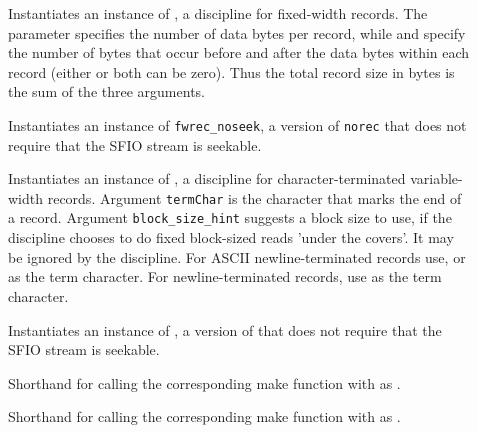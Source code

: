 \begin{description}
\item
[\small{}]
 Instantiates an instance of , a discipline for fixed-width
 records.  The parameter  specifies the number of data bytes per record,
 while  and  specify the number of bytes that
 occur before and after the data bytes within each record (either or
 both can be zero).  Thus the total record size in bytes is the sum
 of the three arguments.  

\item[\small{}]
Instantiates an instance of \texttt{fwrec\_noseek}, a version of \texttt{norec}
that does not require that the SFIO stream is seekable.

\item[\small{}]
Instantiates an instance of , a discipline for
character-terminated variable-width records. Argument \texttt{termChar} is the
character that marks the end of a record. Argument
\texttt{block\_size\_hint} suggests a block size to use, if the
discipline chooses to do fixed block-sized reads 'under the covers'.
It may be ignored by the discipline.
For ASCII newline-terminated records use,  or
as the term character.  For  newline-terminated records, use
 as the term character.


\item[\small{}] 
Instantiates an instance of , a version of 
that does not require that the SFIO stream is seekable.

\item[\small{}]
Shorthand for calling the corresponding  make function with
 as .

\item[\small{}]
Shorthand for calling the corresponding  make function with
 as .




\end{description}
